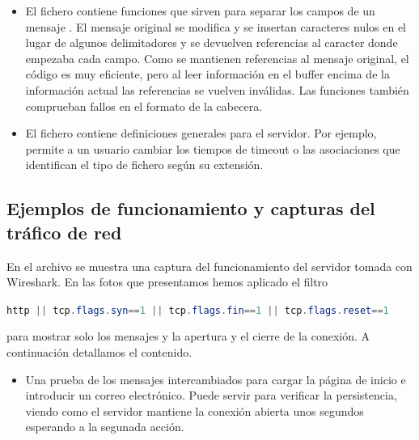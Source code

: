{\begin{itemize}
\item El fichero  contiene funciones que sirven para separar los campos de un mensaje {\HTTP}. El mensaje original se modifica y se insertan caracteres nulos en el lugar de algunos delimitadores y se devuelven referencias al caracter donde empezaba cada campo. Como se mantienen referencias al mensaje original, el código es muy eficiente, pero al leer información en el buffer encima de la información actual las referencias se vuelven inválidas. Las funciones también comprueban fallos en el formato de la cabecera.

\item El fichero  contiene definiciones generales para el servidor. Por ejemplo, permite a un usuario cambiar los tiempos de timeout o las asociaciones  que identifican el tipo de fichero según su extensión.
\end{itemize}



\subsection{Ejemplos de funcionamiento y capturas del tráfico de red}
En el archivo  se muestra una captura del funcionamiento del servidor tomada con Wireshark. En las fotos que presentamos hemos aplicado el filtro
\begin{center}
    \lstinline[language=java, basicstyle=\normalsize]
    {http || tcp.flags.syn==1 || tcp.flags.fin==1 || tcp.flags.reset==1}
\end{center}
para mostrar solo los mensajes {\HTTP} y la apertura y el cierre de la conexión. A continuación detallamos el contenido.

\begin{itemize}
\item [\cref{img-cap-normal}] Una prueba de los mensajes intercambiados para cargar la página de inicio e introducir un correo electrónico. Puede servir para verificar la persistencia, viendo como el servidor mantiene la conexión abierta unos segundos esperando a la segunada acción.


\end{itemize}}
